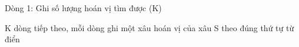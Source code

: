 Dòng 1: Ghi số lượng hoán vị tìm được (K)  

   K dòng tiếp theo, mỗi dòng ghi một xâu hoán vị của xâu S theo đúng thứ tự từ điển  

\